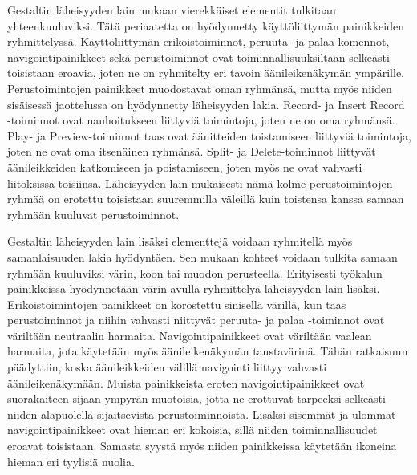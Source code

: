\documentclass[utf8]{gradu3}
\begin{document}
Gestaltin läheisyyden lain mukaan vierekkäiset elementit tulkitaan yhteenkuuluviksi. Tätä periaatetta on hyödynnetty käyttöliittymän painikkeiden ryhmittelyssä. Käyttöliittymän erikoistoiminnot, peruuta- ja palaa-komennot, navigointipainikkeet sekä perustoiminnot ovat toiminnallisuuksiltaan selkeästi toisistaan eroavia, joten ne on ryhmitelty eri tavoin äänileikenäkymän ympärille. Perustoimintojen painikkeet muodostavat oman ryhmänsä, mutta myös niiden sisäisessä jaottelussa on hyödynnetty läheisyyden lakia. Record- ja Insert Record -toiminnot ovat nauhoitukseen liittyviä toimintoja, joten ne on oma ryhmänsä. Play- ja Preview-toiminnot taas ovat äänitteiden toistamiseen liittyviä toimintoja, joten ne ovat oma itsenäinen ryhmänsä. Split- ja Delete-toiminnot liittyvät äänileikkeiden katkomiseen ja poistamiseen, joten myös ne ovat vahvasti liitoksissa toisiinsa. Läheisyyden lain mukaisesti nämä kolme perustoimintojen ryhmää on erotettu toisistaan suuremmilla väleillä kuin toistensa kanssa samaan ryhmään kuuluvat perustoiminnot. 

Gestaltin läheisyyden lain lisäksi elementtejä voidaan ryhmitellä myös samanlaisuuden lakia hyödyntäen. Sen mukaan kohteet voidaan tulkita samaan ryhmään kuuluviksi värin, koon tai muodon perusteella. Erityisesti työkalun painikkeissa hyödynnetään värin avulla ryhmittelyä  läheisyyden lain lisäksi. Erikoistoimintojen painikkeet on korostettu sinisellä värillä, kun taas perustoiminnot ja niihin vahvasti niittyvät peruuta- ja palaa -toiminnot ovat väriltään neutraalin harmaita. Navigointipainikkeet ovat väriltään vaalean harmaita, jota käytetään myös äänileikenäkymän taustavärinä. Tähän ratkaisuun päädyttiin, koska äänileikkeiden välillä navigointi liittyy vahvasti äänileikenäkymään. Muista painikkeista eroten navigointipainikkeet ovat suorakaiteen sijaan ympyrän muotoisia, jotta ne erottuvat tarpeeksi selkeästi niiden alapuolella sijaitsevista perustoiminnoista. Lisäksi sisemmät ja ulommat navigointipainikkeet ovat hieman eri kokoisia, sillä niiden toiminnallisuudet eroavat toisistaan. Samasta syystä myös niiden painikkeissa käytetään ikoneina hieman eri tyylisiä nuolia.
\end{document}
